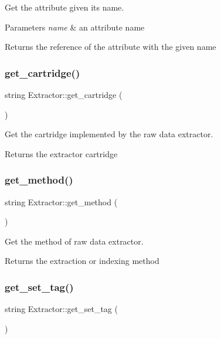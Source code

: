 Get the attribute given its name. 
\begin{DoxyParams}{Parameters}
{\em name} & an attribute name \\
\hline
\end{DoxyParams}
\begin{DoxyReturn}{Returns}
the reference of the attribute with the given name 
\end{DoxyReturn}
\mbox{\label{classExtractor_a44ed7358715318d58dc5246ab43fcd2b}} 
\subsubsection{\texorpdfstring{get\+\_\+cartridge()}{get\_cartridge()}}
{\footnotesize\ttfamily string Extractor\+::get\+\_\+cartridge (\begin{DoxyParamCaption}{ }\end{DoxyParamCaption})}

Get the cartridge implemented by the raw data extractor. \begin{DoxyReturn}{Returns}
the extractor cartridge 
\end{DoxyReturn}
\mbox{\label{classExtractor_ae76e664785cb63537295ce404e728191}} 
\subsubsection{\texorpdfstring{get\+\_\+method()}{get\_method()}}
{\footnotesize\ttfamily string Extractor\+::get\+\_\+method (\begin{DoxyParamCaption}{ }\end{DoxyParamCaption})}

Get the method of raw data extractor. \begin{DoxyReturn}{Returns}
the extraction or indexing method 
\end{DoxyReturn}
\mbox{\label{classExtractor_a133d1cd6a2749254614d7cebd9832cea}} 
\subsubsection{\texorpdfstring{get\+\_\+set\+\_\+tag()}{get\_set\_tag()}}
{\footnotesize\ttfamily string Extractor\+::get\+\_\+set\+\_\+tag (\begin{DoxyParamCaption}{ }\end{DoxyParamCaption})}

